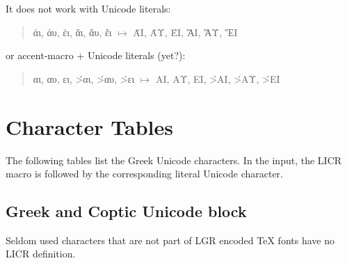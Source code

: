 \documentclass[a4paper]{article}
\begin{document}
It does not work with Unicode literals:
\begin{quote}
  άι, άυ, έι, ἄι, ἄυ, ἔι $\mapsto$ \MakeUppercase{άι, άυ, έι, ἄι, ἄυ, ἔι}
\end{quote}

or accent-macro + Unicode literals (yet?):
\begin{quote}
  \acctonos αι, \acctonos αυ, \acctonos ει, \'>αι, \'>αυ, \'>ει
  $\mapsto$
  \MakeUppercase{\acctonos αι, \acctonos αυ, \acctonos ει, \'>αι, \'>αυ, \'>ει}
\end{quote}

\section{Character Tables}

The following tables list the Greek Unicode characters. In the input, the
LICR macro is followed by the corresponding literal Unicode character.

\subsection{Greek and Coptic Unicode block}

Seldom used characters that are not part of LGR encoded TeX fonts have no
LICR definition.
\end{document}
